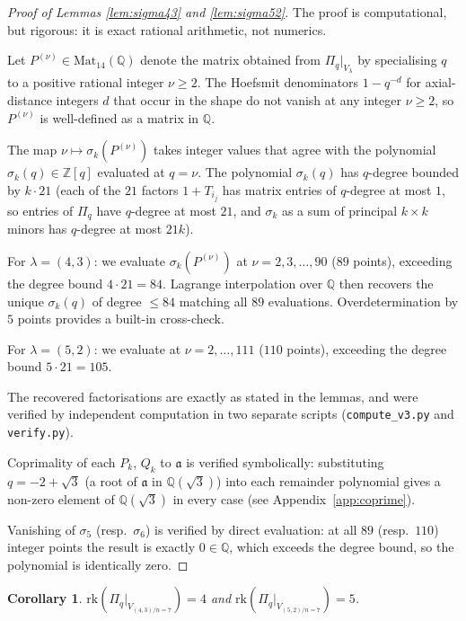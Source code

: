 \documentclass[11pt]{article}
\theoremstyle{plain}
\newtheorem{corollary}[theorem]{Corollary}
\theoremstyle{definition}
\theoremstyle{remark}
\newcommand{\Z}{\mathbb{Z}}
\newcommand{\Q}{\mathbb{Q}}
\newcommand{\Pibs}{\Pi_q}
\newcommand{\rk}{\mathrm{rk}}
\newcommand{\atom}{\mathfrak{a}}
\begin{document}
\begin{proof}[Proof of Lemmas \ref{lem:sigma43} and \ref{lem:sigma52}]
The proof is computational, but rigorous: it is exact rational arithmetic, not numerics.

Let $P^{(\nu)} \in \mathrm{Mat}_{14}(\Q)$ denote the matrix obtained from
$\Pibs|_{V_\lambda}$ by specialising $q$ to a positive rational integer
$\nu \geq 2$.  The Hoefsmit denominators $1 - q^{-d}$ for axial-distance integers
$d$ that occur in the shape do not vanish at any integer $\nu \geq 2$, so $P^{(\nu)}$
is well-defined as a matrix in $\Q$.

The map $\nu \mapsto \sigma_k(P^{(\nu)})$ takes integer values that agree with the
polynomial $\sigma_k(q) \in \Z[q]$ evaluated at $q = \nu$.  The polynomial
$\sigma_k(q)$ has $q$-degree bounded by $k \cdot 21$ (each of the $21$ factors
$1+T_{i_j}$ has matrix entries of $q$-degree at most $1$, so entries of $\Pibs$
have $q$-degree at most $21$, and $\sigma_k$ as a sum of principal $k\times k$ minors
has $q$-degree at most $21k$).

For $\lambda = (4,3)$: we evaluate $\sigma_k(P^{(\nu)})$ at $\nu = 2, 3, \ldots, 90$
($89$ points), exceeding the degree bound $4 \cdot 21 = 84$.  Lagrange
interpolation over $\Q$ then recovers the unique $\sigma_k(q)$ of degree
$\leq 84$ matching all $89$ evaluations.  Overdetermination by $5$ points provides
a built-in cross-check.

For $\lambda = (5,2)$: we evaluate at $\nu = 2, \ldots, 111$ ($110$ points),
exceeding the degree bound $5 \cdot 21 = 105$.

The recovered factorisations are exactly as stated in the lemmas, and were verified
by independent computation in two separate scripts (\texttt{compute\_v3.py} and
\texttt{verify.py}).

Coprimality of each $P_k$, $Q_k$ to $\atom$ is verified symbolically: substituting
$q = -2 + \sqrt{3}$ (a root of $\atom$ in $\Q(\sqrt{3})$) into each remainder polynomial
gives a non-zero element of $\Q(\sqrt{3})$ in every case (see Appendix~\ref{app:coprime}).

Vanishing of $\sigma_5$ (resp.\ $\sigma_6$) is verified by direct evaluation: at all
$89$ (resp.\ $110$) integer points the result is exactly $0 \in \Q$, which exceeds the
degree bound, so the polynomial is identically zero.
\end{proof}

\begin{corollary}
\label{cor:rank}
$\rk(\Pibs|_{V_{(4,3)/n=7}}) = 4$ and $\rk(\Pibs|_{V_{(5,2)/n=7}}) = 5$.
\end{corollary}
\end{document}
